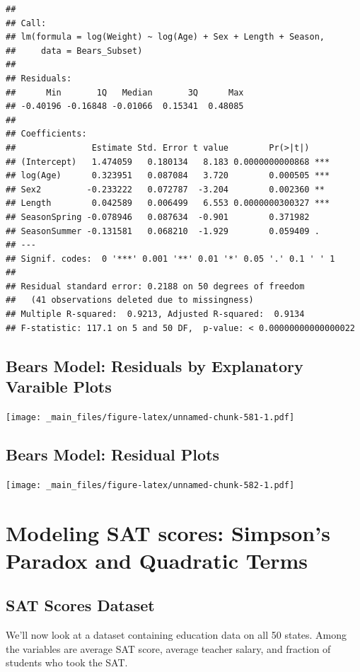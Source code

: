 \documentclass[]{book}
\begin{document}
\begin{verbatim}
## 
## Call:
## lm(formula = log(Weight) ~ log(Age) + Sex + Length + Season, 
##     data = Bears_Subset)
## 
## Residuals:
##      Min       1Q   Median       3Q      Max 
## -0.40196 -0.16848 -0.01066  0.15341  0.48085 
## 
## Coefficients:
##               Estimate Std. Error t value        Pr(>|t|)    
## (Intercept)   1.474059   0.180134   8.183 0.0000000000868 ***
## log(Age)      0.323951   0.087084   3.720        0.000505 ***
## Sex2         -0.233222   0.072787  -3.204        0.002360 ** 
## Length        0.042589   0.006499   6.553 0.0000000300327 ***
## SeasonSpring -0.078946   0.087634  -0.901        0.371982    
## SeasonSummer -0.131581   0.068210  -1.929        0.059409 .  
## ---
## Signif. codes:  0 '***' 0.001 '**' 0.01 '*' 0.05 '.' 0.1 ' ' 1
## 
## Residual standard error: 0.2188 on 50 degrees of freedom
##   (41 observations deleted due to missingness)
## Multiple R-squared:  0.9213, Adjusted R-squared:  0.9134 
## F-statistic: 117.1 on 5 and 50 DF,  p-value: < 0.00000000000000022
\end{verbatim}

\subsection{Bears Model: Residuals by Explanatory Varaible
Plots}\label{bears-model-residuals-by-explanatory-varaible-plots-1}

\texttt{[image: \_main\_files/figure-latex/unnamed-chunk-581-1.pdf]}

\subsection{Bears Model: Residual
Plots}\label{bears-model-residual-plots}

\texttt{[image: \_main\_files/figure-latex/unnamed-chunk-582-1.pdf]}

\section{Modeling SAT scores: Simpson's Paradox and Quadratic
Terms}\label{modeling-sat-scores-simpsons-paradox-and-quadratic-terms}

\subsection{SAT Scores Dataset}\label{sat-scores-dataset}

We'll now look at a dataset containing education data on all 50 states.
Among the variables are average SAT score, average teacher salary, and
fraction of students who took the SAT.
\end{document}
